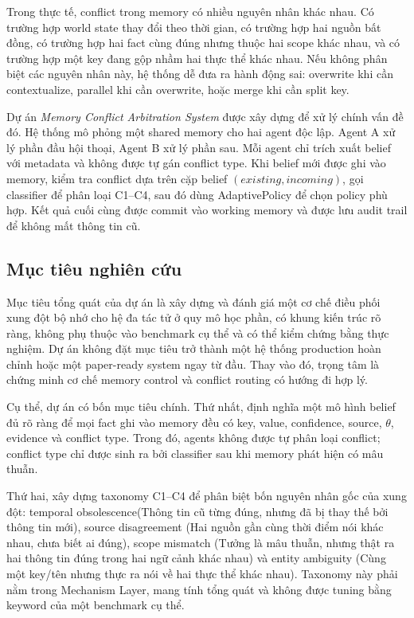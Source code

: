 \documentclass[12pt,a4paper]{article}
\begin{document}
Trong thực tế, conflict trong memory có nhiều nguyên nhân khác nhau. Có trường hợp world state thay đổi theo thời gian, có trường hợp hai nguồn bất đồng, có trường hợp hai fact cùng đúng nhưng thuộc hai scope khác nhau, và có trường hợp một key đang gộp nhầm hai thực thể khác nhau. Nếu không phân biệt các nguyên nhân này, hệ thống dễ đưa ra hành động sai: overwrite khi cần contextualize, parallel khi cần overwrite, hoặc merge khi cần split key.

Dự án \textit{Memory Conflict Arbitration System} được xây dựng để xử lý chính vấn đề đó. Hệ thống mô phỏng một shared memory cho hai agent độc lập. Agent A xử lý phần đầu hội thoại, Agent B xử lý phần sau. Mỗi agent chỉ trích xuất belief với metadata và không được tự gán conflict type. Khi belief mới được ghi vào memory, kiểm tra conflict dựa trên cặp belief \((existing, incoming)\), gọi classifier để phân loại C1--C4, sau đó dùng AdaptivePolicy để chọn policy phù hợp. Kết quả cuối cùng được commit vào working memory và được lưu audit trail để không mất thông tin cũ.

\subsection{Mục tiêu nghiên cứu}

Mục tiêu tổng quát của dự án là xây dựng và đánh giá một cơ chế điều phối xung đột bộ nhớ cho hệ đa tác tử ở quy mô học phần, có khung kiến trúc rõ ràng, không phụ thuộc vào benchmark cụ thể và có thể kiểm chứng bằng thực nghiệm. Dự án không đặt mục tiêu trở thành một hệ thống production hoàn chỉnh hoặc một paper-ready system ngay từ đầu. Thay vào đó, trọng tâm là chứng minh cơ chế memory control và conflict routing có hướng đi hợp lý.

Cụ thể, dự án có bốn mục tiêu chính. Thứ nhất, định nghĩa một mô hình belief đủ rõ ràng để mọi fact ghi vào memory đều có key, value, confidence, source, \(\theta\), evidence và conflict type. Trong đó, agents không được tự phân loại conflict; conflict type chỉ được sinh ra bởi classifier sau khi memory phát hiện có mâu thuẫn.

Thứ hai, xây dựng taxonomy C1--C4 để phân biệt bốn nguyên nhân gốc của xung đột: temporal obsolescence(Thông tin cũ từng đúng, nhưng đã bị thay thế bởi thông tin mới), source disagreement (Hai nguồn gần cùng thời điểm nói khác nhau, chưa biết ai đúng), scope mismatch (Tưởng là mâu thuẫn, nhưng thật ra hai thông tin đúng trong hai ngữ cảnh khác nhau) và entity ambiguity (Cùng một key/tên nhưng thực ra nói về hai thực thể khác nhau). Taxonomy này phải nằm trong Mechanism Layer, mang tính tổng quát và không được tuning bằng keyword của một benchmark cụ thể.
\end{document}
